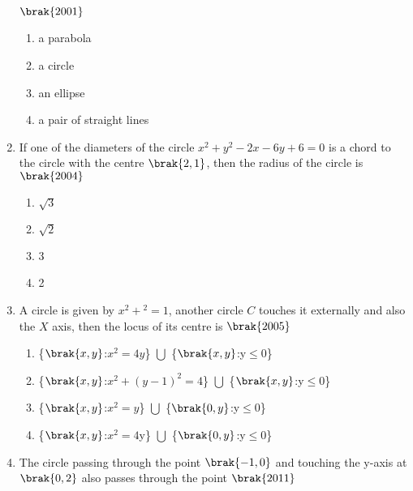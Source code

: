 \begin{enumerate}
        \hfill$\brak{2001}$
        \begin{multicols}{2}
\begin{enumerate}
        \item a parabola
        \item a circle
        \item an ellipse
        \item a pair of straight lines
        \end{enumerate}
        \end{multicols}
     \item If one of the diameters of the circle $x^2+y^2-2x-6y+6=0$ is a chord to the circle with the centre $\brak{2, 1}$, then the radius of the circle is 
         \hfill$\brak{2004}$
         \begin{multicols}{2}
     \begin{multicols}{4}
\begin{enumerate}
         \item $\sqrt3$
         \item $\sqrt2$
         \item 3
         \item 2
     \end{enumerate}
\end{multicols}
     \end{multicols}
     \item A circle is given by $x^2+$$^2=1$,  another circle $C$ touches it externally and also the $X$ axis,  then the locus of its centre is
         \hfill$\brak{2005}$
     \begin{multicols}{2}
\begin{enumerate}
         \item \{$\brak{x, y}$:$x^2=4y$\} $\bigcup$ \{$\brak{x, y}$:y$\le$0\}
         \item \{$\brak{x, y}$:$x^2+(y-1)^2=4$\} $\bigcup$ \{$\brak{x, y}$:y$\le$0\}
         \item \{$\brak{x, y}$:$x^2=y$\} $\bigcup$ \{$\brak{0, y}$:y$\le$0\}
         \item \{$\brak{x, y}$:$x^2=4$y\} $\bigcup$ \{$\brak{0, y}$:y$\le$0\}
         \end{enumerate}
         \end{multicols}
             \item The circle passing through the point $\brak{-1, 0}$ and touching the y-axis at $\brak{0, 2}$ also passes through the point
                 \hfill$\brak{2011}$
             \begin{multicols}{4}

\end{multicols}
\end{enumerate}
